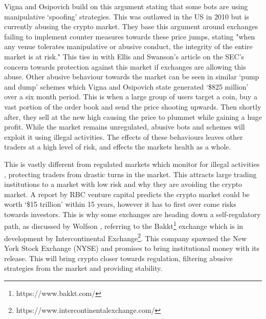 Vigna and Osipovich \cite{ART:VIGNA:2018} build on this argument stating that some bots are using manipulative `spoofing' strategies. This was outlawed in the US in 2010 but is currently abusing the crypto market. They base this argument around exchanges failing to implement counter measures towards these price jumps, stating "when any venue tolerates manipulative or abusive conduct, the integrity of the entire market is at risk." This ties in with Ellis and Swanson's article \cite{ART:ELLIS:2018} on the SEC's concern towards protection against this market if exchanges are allowing this abuse. Other abusive behaviour towards the market can be seen in similar `pump and dump' schemes which Vigna and Osipovich \cite{ART:VIGNA:2018} state generated `\$825 million' over a six month period. This is when a large group of users target a coin, buy a vast portion of the order book and send the price shooting upwards. Then shortly after, they sell at the new high causing the price to plummet while gaining a huge profit. While the market remains unregulated, abusive bots and schemes will exploit it using illegal activities. The effects of these behaviours leaves other traders at a high level of risk, and effects the markets health as a whole.

This is vastly different from regulated markets which monitor for illegal activities \cite{VIGNA}, protecting traders from drastic turns in the market. This attracts large trading institutions to a market with low risk and why they are avoiding the crypto market. A report by RBC venture capital predicts the crypto market could be worth `\$15 trillion' within 15 years, however it has to first over come risks towards investors. This is why some exchanges are heading down a self-regulatory path, as discussed by Wolfson \cite{ART:WOLFSON:2018}, referring to the Bakkt\footnote{https://www.bakkt.com/} exchange which is in development by Intercontinental Exchange\footnote{https://www.intercontinentalexchange.com/}. This company spawned the New York Stock Exchange (NYSE) and promises to bring institutional money with its release. This will bring crypto closer towards regulation, filtering abusive strategies from the market and providing stability.


